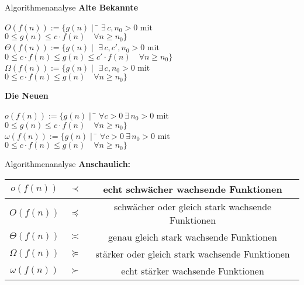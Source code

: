 \begin{frame}{Algorithmenanalyse}
	\textbf{Alte Bekannte} \\ \vspace{-.7\baselineskip}
	\begin{tabbing}
		$O(f(n)) := \{ g(n) \mid $ \= $\exists\, c, n_0 > 0\text{ mit }$ \\
					\> $0 \leq g(n) \leq c \cdot f(n) \quad \forall n \geq n_0 \}$ \\
		$\Theta(f(n)) := \{ g(n) \mid $ \> $ \exists\, c, c', n_0 > 0\text{ mit }$ \\
					\> $0 \leq c \cdot f(n) \leq g(n) \leq c' \cdot f(n) \quad \forall n \geq n_0 \}$ \\
		$\Omega(f(n)) := \{ g(n) \mid $ \> $\exists\, c, n_0 > 0\text{ mit }$ \\
					\> $0 \leq c \cdot f(n) \leq g(n) \quad \forall n \geq n_0 \}$ 
	\end{tabbing} 
	\pause
	\smallskip
	\textbf{Die Neuen} \\ \vspace{-.7\baselineskip}
	\begin{tabbing}
		$o(f(n)) := \{g(n) \mid $ \= $\forall c > 0 \ \exists\, n_0 > 0$ mit \\
		\> $ 0 \leq g(n) \leq c \cdot f(n) \quad \forall n \geq n_0 \}$ \\
		$\omega (f(n)) := \{g(n) \mid $ \= $ \forall c > 0 \ \exists\, n_0 > 0$ mit \\
		\> $ 0 \leq c \cdot f(n) \leq g(n) \quad \forall n \geq n_0 \}$
	\end{tabbing}
\end{frame}

\begin{frame}{Algorithmenanalyse}
	\textbf{Anschaulich:} \\[0,125cm]
	{
		
		\renewcommand{\arraystretch}{2}%
		\begin{tabular}{ | c | >{\Large}c | c | }
			\hline
			$     o (f(n))$ & $\prec$ & echt schwächer wachsende Funktionen
			\\ \hline
			$     O (f(n))$ & $\preccurlyeq$ & schwächer oder gleich stark wachsende Funktionen
			\\ \hline
			$\Theta (f(n))$ & $\asymp$ & genau gleich stark wachsende Funktionen
			\\ \hline
			$\Omega (f(n))$ & $\succcurlyeq$ & stärker oder gleich stark wachsende Funktionen
			\\ \hline
			$\omega (f(n))$ & $\succ$ & echt stärker wachsende Funktionen
			\\ \hline
		\end{tabular}
		\renewcommand{\arraystretch}{\stdarraystretch}
	}
\end{frame}


